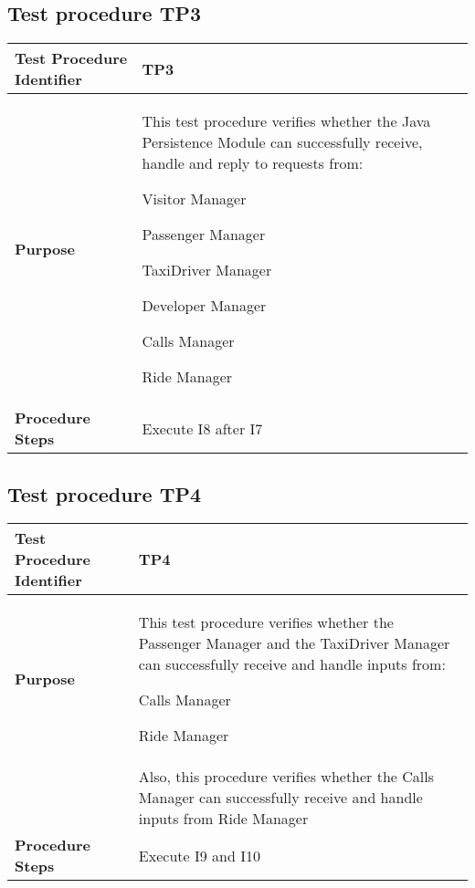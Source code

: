 \subsection{Test procedure TP3}

\begin{table}[!htbp]
\begin{center}
\begin{tabular}[t]{p{}|p{}}

\hline
\textbf{Test Procedure Identifier} & TP3 \\
\hline
\textbf{Purpose} & This test procedure verifies whether the Java Persistence Module can successfully receive, handle and reply to requests from:
\begin{itemize*}
	\item Visitor Manager
	\item Passenger Manager
	\item TaxiDriver Manager
	\item Developer Manager
	\item Calls Manager
	\item Ride Manager
\end{itemize*} \\
\hline
\textbf{Procedure Steps} & Execute I8 after I7\\
\hline

\end{tabular}
\end{center}
\end{table}


\subsection{Test procedure TP4}

\begin{table}[!htbp]
\begin{center}
\begin{tabular}[t]{p{}|p{}}

\hline
\textbf{Test Procedure Identifier} & TP4 \\
\hline
\textbf{Purpose} & This test procedure verifies whether the Passenger Manager and the TaxiDriver Manager can successfully receive and handle inputs from:
\begin{itemize*}
	\item Calls Manager
	\item Ride Manager
\end{itemize*} \\
\hline
 & Also, this procedure verifies whether the Calls Manager can successfully receive and handle inputs from Ride Manager \\
\textbf{Procedure Steps} & Execute I9 and I10\\
\hline

\end{tabular}
\end{center}
\end{table}


